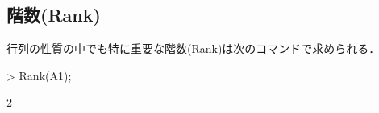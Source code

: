 \subsection{階数(Rank)}
行列の性質の中でも特に重要な階数(Rank)は次のコマンドで求められる．
\begin{MapleInput}
> Rank(A1);
\end{MapleInput}
\begin{MapleOutput}
2
\end{MapleOutput}